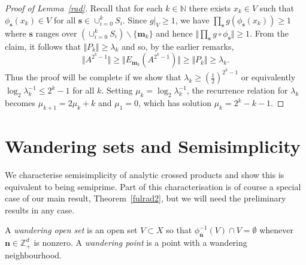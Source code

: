 \documentclass[12pt]{amsart}
\theoremstyle{definition}
\newcommand{\bbZ}{\mathbb{Z}}
\newcommand{\bo}[1]{\mathbf{#1}}
\newcommand{\bom}{\mathbf{m}}
\newcommand{\bon}{\mathbf{n}}
\begin{document}
\begin{proof}[Proof of Lemma~\ref{rad}]
\medskip

Recall that for each $k\in \mathbb{N}$ there exists $x_{k}\in V$
such that $\phi _{\bo{s}}(x_{k})\in V$ for all
$\bo{s}\in \cup _{i=0}^{k}S_{i}$. Since $g|_{V}\geq 1$, we have
$\displaystyle\prod_{\bo{s}}g(\phi _{\bo{s}}(x_{k}))\geq 1$ where
$\bo{s}$ ranges over  $(\cup_{i=0}^{k}S_i)\backslash \{\bo{m}_k \}$
and hence
$\displaystyle\Vert\prod_{\bo{s}}g\circ \phi _{\bo{s}}\Vert \geq 1$.
 From the claim, it follows that $\Vert P_k\Vert \geq \lambda _k$
and so, by the earlier remarks,
\[
\Vert A^{2^{k}-1}\Vert\geq\Vert
E_{\bom_{k}}(A^{2^{k}-1})\Vert\geq\Vert
P_{k}\Vert\geq\lambda_{k}.
\]
Thus the proof will be complete if we show that $\lambda_{k}\geq(\frac{1}%
{2})^{2^{k}-1}$ or equivalently
$\log_2\lambda_{k}^{-1}\leq2^{k}-1$ for all $k$.
Setting $\mu_{k}=\log_2\lambda_{k}^{-1}$, the recurrence
relation for $\lambda_k$ becomes $\mu _{k+1}=2\mu_{k}+k$ and $\mu_1=0$,
which has solution $\mu_{k}=2^{k}-k-1$.
\end{proof}

\section{Wandering sets and Semisimplicity}

We characterise semisimplicity of analytic crossed products and
show this is equivalent to being semiprime.
Part of this characterisation is of course a special case of our
main result, Theorem~\ref{fulrad2}, but we will need the
preliminary results in any case.

A \emph{wandering open set} is an open set $V\subset X$ so that
$\phi_{\bon}^{-1}(V)\cap V= \emptyset$ whenever $\bo{n}\in\bbZ_+^d$ is nonzero.
A \emph{wandering point }is a point with a wandering neighbourhood.
\end{document}
